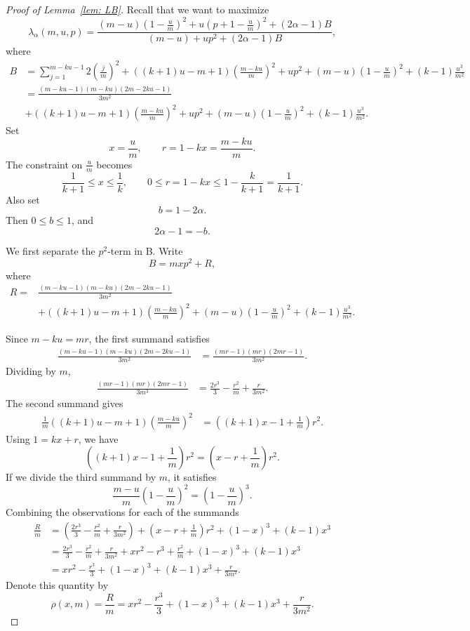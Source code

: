 \documentclass[%
english, titlepage=false %
]{./tum-templates/book/tumbook}
\begin{document}
\label{app:proof-LB}
\begin{proof}[\hypertarget{proof:LB}{Proof of Lemma~\ref{lem: LB}}]

Recall that we want to maximize 
\[
\lambda_{\alpha}(m,u,p)=\frac{
(m-u)\left(1-\frac um\right)^2
 +u\left(p+1-\frac um\right)^2
 +(2\alpha-1)B
}{
(m-u)+up^2+(2\alpha-1)B
},
\]
where
\[
\begin{aligned}
B&=\sum_{j=1}^{m-ku-1}2\left(\frac{j}{m}\right)^2+\left((k+1)u-m+1\right)\left(\frac{m-ku}{m}\right)^2
+up^2
+(m-u)\left(1-\frac um\right)^2
+(k-1)\frac{u^3}{m^2}\\
&=\frac{(m-ku-1)(m-ku)(2m-2ku-1)}{3m^2}  \\
&+\left((k+1)u-m+1\right)\left(\frac{m-ku}{m}\right)^2
+up^2
+(m-u)\left(1-\frac um\right)^2
+(k-1)\frac{u^3}{m^2}.
\end{aligned}
\]
Set
\[
        x=\frac{u}{m}, \qquad r=1-kx=\frac{m-ku}{m}.
\]
The constraint on $\frac{u}{m}$ becomes
\[
        \frac{1}{k+1}\leq x\leq \frac1k,
        \qquad 0\leq r = 1-kx \le 1-\frac{k}{k+1} = \frac{1}{k+1}.
\]
Also set
\[
        b=1-2\alpha.
\]
Then \(0\leq b\leq 1\), and
\[
        2\alpha-1=-b.
\]

We first separate the \(p^2\)-term in B. Write
\[
        B=mxp^2+R,
\]
where
\[
\begin{aligned}
R={}&
\frac{(m-ku-1)(m-ku)(2m-2ku-1)}{3m^2}  \\
&+\left((k+1)u-m+1\right)\left(\frac{m-ku}{m}\right)^2
+(m-u)\left(1-\frac um\right)^2
+(k-1)\frac{u^3}{m^2}.
\end{aligned}
\]

Since \(m-ku=mr\), the first summand satisfies
\[
\begin{aligned}
\frac{(m-ku-1)(m-ku)(2m-2ku-1)}{3m^2}
&=
\frac{(mr-1)(mr)(2mr-1)}{3m^2}.
\end{aligned}
\]
Dividing by \(m\),
\[
\begin{aligned}
\frac{(mr-1)(mr)(2mr-1)}{3m^3}
&=
\frac{2r^3}{3}-\frac{r^2}{m}+\frac{r}{3m^2}.
\end{aligned}
\]
The second summand gives
\[
\begin{aligned}
\frac{1}{m}
\left((k+1)u-m+1\right)\left(\frac{m-ku}{m}\right)^2
&=
\left((k+1)x-1+\frac1m\right)r^2.
\end{aligned}
\]
Using \(1=kx+r\), we have
\[
       \left((k+1)x-1+\frac1m\right)r^2= \left(x-r+\frac1m\right)r^2.
\]
If we divide the third summand by $m$, it satisfies
\[
\frac{m-u}{m}\left(1-\frac{u}{m}\right)^2= \left(1-\frac{u}{m}\right)^3.
\]
Combining the observations for each of the summands
\[
\begin{aligned}
\frac{R}{m}
&=
\left(\frac{2r^3}{3}-\frac{r^2}{m}+\frac{r}{3m^2}\right)
+
\left(x-r+\frac1m\right)r^2
+(1-x)^3
+(k-1)x^3 \\
&=
\frac{2r^3}{3}-\frac{r^2}{m}+\frac{r}{3m^2}
+xr^2-r^3+\frac{r^2}{m}
+(1-x)^3
+(k-1)x^3 \\
&=
xr^2-\frac{r^3}{3}
+(1-x)^3
+(k-1)x^3
+\frac{r}{3m^2}.
\end{aligned}
\]
Denote this quantity by
\[
        \rho(x,m)
        =
        \frac{R}{m}
        =
        xr^2-\frac{r^3}{3}
        +(1-x)^3
        +(k-1)x^3
        +\frac{r}{3m^2}.
\]


\end{proof}
\end{document}
